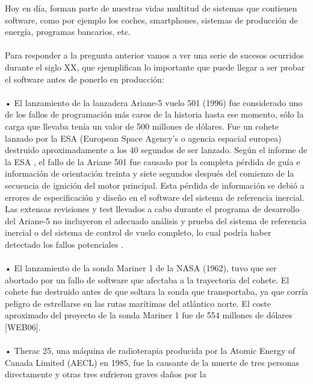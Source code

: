 \documentclass[12pt,letterpaper]{article}
\begin{document}
    Hoy en día, forman parte de nuestras vidas multitud de sistemas que contienen software, como por ejemplo los coches, smartphones, sistemas de producción de energía, programas bancarios, etc.
    \\
    \\
    Para responder a la pregunta anterior vamos a ver una serie de sucesos ocurridos durante el siglo XX, que ejemplifican lo importante que puede llegar a  ser probar el software antes de ponerlo en producción:
    \\
    \\
    •	El lanzamiento de la lanzadera Ariane-5 vuelo 501 (1996) fue considerado uno de los fallos de programación más caros de la historia hasta ese momento, sólo la carga que llevaba tenía un valor de 500 millones de dólares. Fue un cohete lanzado por la ESA (European Space Agency’s o agencia espacial europea) destruido aproximadamente a los 40 segundos  de ser lanzado. Según el informe de la ESA , el fallo de la Ariane 501 fue causado por la completa pérdida de guía e información de orientación treinta y siete segundos después del comienzo de la secuencia de ignición del motor principal. Esta pérdida de información se debió a errores de especificación y diseño en el software del sistema de referencia inercial. Las extensas revisiones y test llevados a cabo durante el programa de desarrollo del Ariane-5 no incluyeron el adecuado análisis y prueba del sistema de referencia inercial o del sistema de control de vuelo completo, lo cual podría haber detectado los fallos potenciales .
    \\
    \\
    •	El lanzamiento de la sonda Mariner 1 de la NASA (1962), tuvo que ser abortado por un fallo de software que afectaba a la trayectoria del cohete. El cohete fue destruido antes de que soltara la sonda que transportaba, ya que corría peligro de estrellarse en las rutas marítimas del atlántico norte. El coste aproximado del proyecto de la sonda Mariner 1 fue de 554 millones de dólares [WEB06].
    \\
    \\
    •	Therac 25, una máquina de radioterapia producida por la Atomic Energy of Canada Limited (AECL) en 1985, fue la causante de la muerte de tres personas directamente y otras tres sufrieron graves daños por la
    
\end{document}
